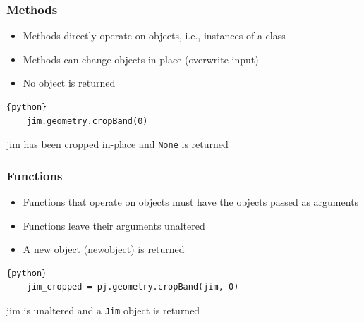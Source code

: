 \documentclass[11pt, handout, aspectratio=169]{beamer}
\begin{document}

\begin{frame}[fragile]
  \frametitle{Methods}
  
  \begin{itemize}
  \item Methods directly operate on objects, i.e., instances of a class
  \item Methods can change objects in-place (overwrite input)
  \item No object is returned
  \end{itemize}

  \begin{lstlisting}{python}
    jim.geometry.cropBand(0)
  \end{lstlisting}
  jim has been cropped in-place and \lstinline{None} is returned

\end{frame}

\begin{frame}[fragile]
  \frametitle{Functions}
  \begin{itemize}
  \item Functions that operate on objects must have the objects passed as arguments
  \item Functions leave their arguments unaltered
  \item A new object (newobject) is returned
  \end{itemize}
  
  \begin{lstlisting}{python}
    jim_cropped = pj.geometry.cropBand(jim, 0)
  \end{lstlisting}
  jim is unaltered and a \lstinline{Jim} object is returned
\end{frame}

\end{document}
